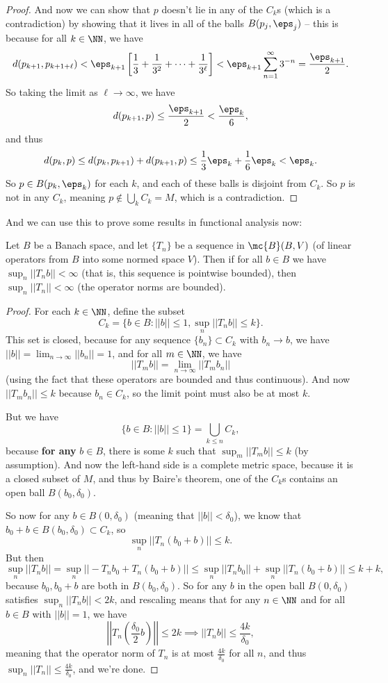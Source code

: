 \begin{proof}
And now we can show that $p$ doesn't lie in any of the $C_k$s (which is a contradiction) by showing that it lives in all of the balls $B(p_j, \eps_j)$ -- this is because for all $k \in \NN$, we have
\[
    d(p_{k+1}, p_{k+1+\ell}) < \eps_{k+1}\left[\frac{1}{3} + \frac{1}{3^2} + \cdots + \frac{1}{3^{\ell}}\right] < \eps_{k+1} \sum_{n=1}^{\infty} 3^{-n} = \frac{\eps_{k+1}}{2}.
\]
So taking the limit as $\ell \to \infty$, we have
\[
    d(p_{k+1}, p) \le \frac{\eps_{k+1}}{2} < \frac{\eps_k}{6},
\]
and thus 
\[
    d(p_k, p) \le d(p_k, p_{k+1}) + d(p_{k+1}, p) \le \frac{1}{3} \eps_k + \frac{1}{6} \eps_k < \eps_k.
\]
So $p \in B(p_k, \eps_k)$ for each $k$, and each of these balls is disjoint from $C_k$. So $p$ is not in any $C_k$, meaning $p \not\in \bigcup_{k} C_k = M$, which is a contradiction.
\end{proof}

And we can use this to prove some results in functional analysis now:

\begin{theorem}
Let $B$ be a Banach space, and let $\{T_n\}$ be a sequence in $\mc{B}(B, V)$ (of linear operators from $B$ into some normed space $V$). Then if for all $b \in B$ we have $\sup_n||T_n b|| < \infty$ (that is, this sequence is pointwise bounded), then $\sup_n||T_n|| < \infty$ (the operator norms are bounded). 
\end{theorem}
\begin{proof}
For each $k \in \NN$, define the subset 
\[
    C_k = \{b \in B: ||b|| \le 1, \sup_n ||T_nb|| \le k\}.
\]
This set is closed, because for any sequence $\{b_n\} \subset C_k$ with $b_n \to b$, we have $||b|| = \lim_{n \to \infty} ||b_n|| = 1$, and for all $m \in \NN$, we have 
\[
    ||T_mb|| = \lim_{n \to \infty} ||T_mb_n||
\]
(using the fact that these operators are bounded and thus continuous). And now $||T_mb_n|| \le k$ because $b_n \in C_k$, so the limit point must also be at most $k$.

But we have
\[
    \{b \in B: ||b|| \le 1\} = \bigcup_{k \le n} C_k,
\]
because \textbf{for any} $b \in B$, there is some $k$ such that $\sup_m ||T_mb|| \le k$ (by assumption). And now the left-hand side is a complete metric space, because it is a closed subset of $M$, and thus by Baire's theorem, one of the $C_k$s contains an open ball $B(b_0, \delta_0)$. 

So now for any $b \in B(0, \delta_0)$ (meaning that $||b|| < \delta_0$), we know that $b_0 + b \in B(b_0, \delta_0) \subset C_k$, so
\[
    \sup_n ||T_n(b_0 + b)|| \le k.
\]
But then 
\[
    \sup_n||T_nb|| = \sup_n ||-T_n b_0 + T_n(b_0 + b)|| \le \sup_n ||T_n b_0|| + \sup_n ||T_n (b_0 + b)|| \le k + k,
\]
because $b_0, b_0 + b$ are both in $B(b_0, \delta_0)$. So for any $b$ in the open ball $B(0, \delta_0)$ satisfies $\sup_n||T_nb|| < 2k$, and rescaling means that for any $n \in \NN$ and for all $b \in B$ with $||b|| = 1$, we have
\[
    \left|\left|T_n\left(\frac{\delta_0}{2}b\right)\right|\right| \le 2k \implies ||T_nb|| \le \frac{4k}{\delta_0},
\]
meaning that the operator norm of $T_n$ is at most $\frac{4k}{\delta_0}$ for all $n$, and thus $\sup_n||T_n|| \le \frac{4k}{\delta_0}$, and we're done. 
\end{proof}

